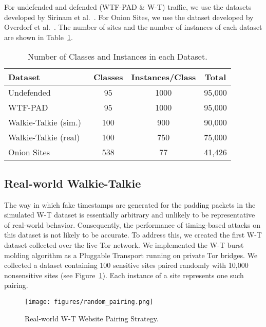 \documentclass[USenglish,oneside,twocolumn]{article}
\begin{document}
For undefended and defended (WTF-PAD \& W-T) traffic, we use the datasets developed by Sirinam et al.~\cite{Sirinam2018}. For Onion Sites, we use the dataset developed by Overdorf et al.~\cite{overdorf2017unique}. The number of sites and the number of instances of each dataset are shown in Table~\ref{tab:datasets}. 

\begin{table}[h]
\renewcommand{\arraystretch}{1.15}
  \begin{center}\vskip -0.5cm
    \caption{Number of Classes and Instances in each Dataset.}\vskip -0.2cm
    \label{tab:datasets}
    \begin{tabular}{l c  c c}
\textbf{Dataset} & \textbf{Classes}& \textbf{Instances/Class} & \textbf{Total}\\
\hline Undefended~\cite{Sirinam2018} & 95 & 1000 & 95,000 \\
WTF-PAD~\cite{Sirinam2018} & 95 &  1000 & 95,000 \\
Walkie-Talkie (sim.)~\cite{Sirinam2018} & 100 &  900 & 90,000 \\
        Walkie-Talkie (real) & 100 & 750 & 75,000 \\
       Onion Sites~\cite{overdorf2017unique} & 538 & 77 & 41,426 \\
       \hline \end{tabular}\vskip -1.2cm
  \end{center} 
\end{table} 
\subsection{Real-world Walkie-Talkie}
\label{sec:real-wt-dataset}

The way in which fake timestamps are generated for the padding packets in the simulated W-T dataset is essentially arbitrary and unlikely to be representative of real-world behavior. Consequently, the performance of timing-based attacks on this dataset is not likely to be accurate. To address this, we created the first W-T dataset collected over the live Tor network. We implemented the W-T burst molding algorithm as a Pluggable Transport running on private Tor bridges. We collected a dataset containing 100 sensitive sites paired randomly with 10,000 nonsensitive sites (see Figure~\ref{pair}). Each instance of a site represents one such pairing. 

\begin{figure}[t]
	\centering
    \texttt{[image: figures/random\_pairing.png]}
    \caption{Real-world W-T Website Pairing Strategy.}
    \label{pair}
    \vskip -0.3cm
\end{figure}
\end{document}
